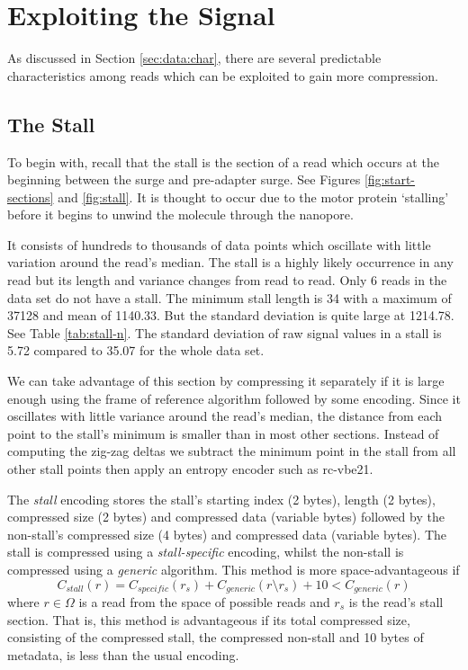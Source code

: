 \section{Exploiting the Signal}

As discussed in Section
\ref{sec:data:char},
there are several predictable characteristics among reads which can be exploited
to gain more compression.

\subsection{The Stall}

To begin with, recall that the stall is the section of a read which occurs at
the beginning between the surge and pre-adapter surge. See Figures
\ref{fig:start-sections} and \ref{fig:stall}. It is thought to occur due to the
motor protein `stalling' before it begins to unwind the molecule through the
nanopore.



It consists of hundreds to thousands of data points which oscillate with little
variation around the read's median. The stall is a highly likely occurrence in
any read but its length and variance changes from read to read.  Only 6 reads in
the data set do not have a stall. The minimum stall length is 34 with a maximum
of \num{37128} and mean of 1140.33. But the standard deviation is quite large at
1214.78. See Table \ref{tab:stall-n}. The standard deviation of raw signal
values in a stall is 5.72 compared to 35.07 for the whole data set.



We can take advantage of this section by compressing it separately if it is
large enough using the frame of reference algorithm followed by some encoding.
Since it oscillates with little variance around the read's median, the distance
from each point to the stall's minimum is smaller than in most other sections.
Instead of computing the zig-zag deltas we subtract the minimum point in the
stall from all other stall points then apply an entropy encoder such as
rc-vbe21.

The \textit{stall} encoding stores the stall's starting index (2 bytes), length
(2 bytes), compressed size (2 bytes) and compressed data (variable bytes)
followed by the non-stall's compressed size (4 bytes) and compressed data
(variable bytes). The stall is compressed using a \textit{stall-specific}
encoding, whilst the non-stall is compressed using a \textit{generic} algorithm.
This method is more space-advantageous if
\[ C_{stall}(r) = C_{specific}(r_s) + C_{generic}(r\setminus r_s) + 10 < C_{generic}(r) \]
where $r\in\Omega$ is a read from the space of possible reads and $r_s$ is the
read's stall section. That is, this method is advantageous if its total
compressed size, consisting of the compressed stall, the compressed non-stall
and 10 bytes of metadata, is less than the usual encoding.

